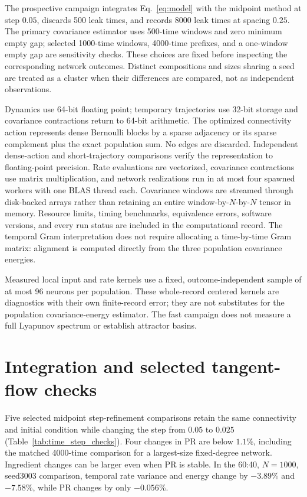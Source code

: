\documentclass[11pt]{article}
\begin{document}
The prospective campaign integrates Eq.~\eqref{eq:model} with the midpoint
method at step $0.05$, discards 500 leak times, and records 8000 leak times
at spacing $0.25$. The primary covariance estimator uses 500-time windows
and zero minimum empty gap; selected 1000-time windows, 4000-time prefixes,
and a one-window empty gap are sensitivity checks. These choices are fixed
before inspecting the corresponding network outcomes. Distinct compositions
and sizes sharing a seed are treated as a cluster when their differences
are compared, not as independent observations.

Dynamics use 64-bit floating point; temporary trajectories use 32-bit storage
and covariance contractions return to 64-bit arithmetic. The optimized
connectivity action represents dense Bernoulli blocks by a sparse adjacency
or its sparse complement plus the exact population sum. No edges are
discarded. Independent dense-action and short-trajectory comparisons verify
the representation to floating-point precision. Rate evaluations are
vectorized, covariance contractions use matrix multiplication, and network
realizations run in at most four spawned workers with one BLAS thread each.
Covariance windows are streamed through disk-backed arrays rather than
retaining an entire window-by-$N$-by-$N$ tensor in memory. Resource limits,
timing benchmarks, equivalence errors, software versions, and every run
status are included in the computational record.
The temporal Gram interpretation does not require allocating a
time-by-time Gram matrix: alignment is computed directly from the three
population covariance energies.

Measured local input and rate kernels use a fixed, outcome-independent sample
of at most 96 neurons per population. These whole-record centered kernels are
diagnostics with their own finite-record error; they are not substitutes for
the population covariance-energy estimator. The fast campaign does not
measure a full Lyapunov spectrum or establish attractor basins.

\section{Integration and selected tangent-flow checks}
\label{app:integration_checks}

Five selected midpoint step-refinement comparisons retain the same
connectivity and initial condition while changing the step from $0.05$ to
$0.025$ (Table~\ref{tab:time_step_checks}). Four changes in PR are below
$1.1\%$, including the matched 4000-time comparison for a largest-size
fixed-degree network. Ingredient changes can be larger even when PR is
stable. In the 60:40, $N=1000$, seed3003 comparison, temporal rate variance
and energy change by $-3.89\%$ and $-7.58\%$, while PR changes by only
$-0.056\%$.
\end{document}
